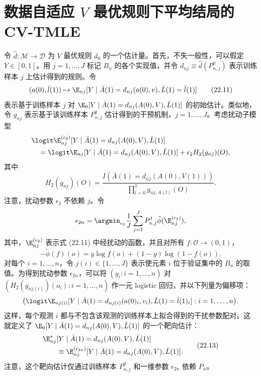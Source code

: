 \section{数据自适应 $V$ 最优规则下平均结局的 CV-TMLE}

令 $\hat d:\mathcal M\to\mathcal D$ 为 $V$ 最优规则 $d_0$ 的一个估计量。首先，不失一般性，可以假定 $Y\in[0,1]$。用 $j=1,\ldots,J$ 标记 $B_n$ 的各个实现值，并令 $d_{nj}\equiv\hat d(P_{n,j}^0)$ 表示训练样本 $j$ 上估计得到的规则。令
\begin{equation}
 (a(0),\bar l(1))\mapsto
 \E_{nj}[Y\mid\bar A(1)=d_{nj}(a(0),v),\bar L(1)=\bar l(1)]
\tag{22.11}
\end{equation}
表示基于训练样本 $j$ 对 $\E_0[Y\mid\bar A(1)=d_{nj}(A(0),V),\bar L(1)]$ 的初始估计。类似地，令 $g_{nj}$ 表示基于该训练样本 $P_{n,j}^0$ 估计得到的干预机制，$j=1,\ldots,J$。考虑扰动子模型
\[
\begin{aligned}
 &\logit\E_{nj}^{(\epsilon_2)}[Y\mid\bar A(1)=d_{nj}(A(0),V),\bar L(1)]\\
 &\quad=\logit\E_{nj}[Y\mid\bar A(1)=d_{nj}(A(0),V),\bar L(1)]
 +\epsilon_2H_2(g_{nj})(O),
\end{aligned}
\]
其中
\[
 H_2(g_{nj})(O)=
 \frac{I(\bar A(1)=d_{nj}(A(0),V(1)))}{\prod_{l=0}^1g_{nj,A(l)}(O)}.
\]
注意，扰动参数 $\epsilon_2$ 不依赖 $j$。令
\[
 \epsilon_{2n}=\argmin_{\epsilon_2}\frac1J\sum_{j=1}^JP_{n,j}^1
 \tilde\phi(\E_{nj}^{(\epsilon_2)}),
\]
其中，$\E_{nj}^{(\epsilon_2)}$ 表示式 (22.11) 中经扰动的函数，并且对所有 $f:\mathcal O\to(0,1)$，
\begin{equation}
 -\tilde\phi(f)(o)=y\log f(o)+(1-y)\log(1-f(o)).
\tag{22.12}
\end{equation}
对每个 $i=1,\ldots,n$，令 $j(i)\in\{1,\ldots,J\}$ 表示使元素 $i$ 位于验证集中的 $B_n$ 的取值。为得到扰动参数 $\epsilon_{2n}$，可以将 $(y_i:i=1,\ldots,n)$ 对 $(H_2(g_{nj(i)})(o_i):i=1,\ldots,n)$ 作一元 logistic 回归，并以下列量为偏移项：
\[
 \bigl(\logit\E_{nj(i)}[Y\mid\bar A(1)=d_{nj(i)}(a(0)_i,v_i),
 \bar L(1)=\bar l(1)_i]:i=1,\ldots,n\bigr).
\]
这样，每个观测 $i$ 都与不包含该观测的训练样本上拟合得到的干扰参数配对。这就定义了 $\E_0[Y\mid\bar A(1)=d_{nj}(A(0),V),\bar L(1)]$ 的一个靶向估计：
\begin{equation}
\begin{aligned}
 &\E_{nj}^*[Y\mid\bar A(1)=d_{nj}(A(0),V),\bar L(1)]\\
 &\qquad\equiv\E_{nj}^{(\epsilon_{2n})}[Y\mid\bar A(1)=d_{nj}(A(0),V),\bar L(1)].
\end{aligned}
\tag{22.13}
\end{equation}
注意，这个靶向估计仅通过训练样本 $P_{n,j}^0$ 和一维参数 $\epsilon_{2n}$ 依赖 $P_n$。

